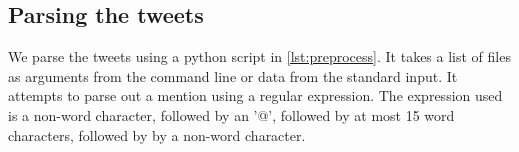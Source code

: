 \documentclass[a4paper,10pt,hidelinks]{article}
\begin{document}
\subsection{Parsing the tweets}

We parse the tweets using a python script in \autoref{lst:preprocess}. It takes a list of files as arguments from the command line or data from the standard input. It attempts to parse out a mention using a regular expression. The expression used is a non-word character, followed by an '@', followed by at most 15 word characters, followed by by a non-word character.


\end{document}
